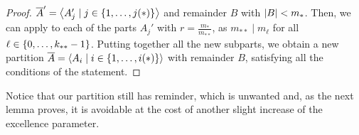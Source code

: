 \begin{lemma}[Claim 5.14.1a]
\begin{proof}
                $\overline{A}' = \left< A_j' \mid j \in \{ 1, \dots, j(*) \} \right>$ and remainder $B$ with $| B | < m_*$.
                Then, we can apply  to each of the parts $A_j'$
                with $r = \frac{m_*}{m_{**}}$, as $m_{**} \mid m_\ell$ for all $\ell \in \{ 0, \dots, k_{**} - 1 \}$.
                Putting together all the new subparts, we obtain a new partition
                $\overline{A} = \left< A_i \mid i \in \{ 1, \dots, i(*) \} \right>$
                with remainder $B$, satisfying all the conditions of the statement.
            \end{proof}
        \end{lemma}

        Notice that our partition still has reminder, which is unwanted and, as the next lemma proves,
        it is avoidable at the cost of another slight increase of the excellence parameter.

